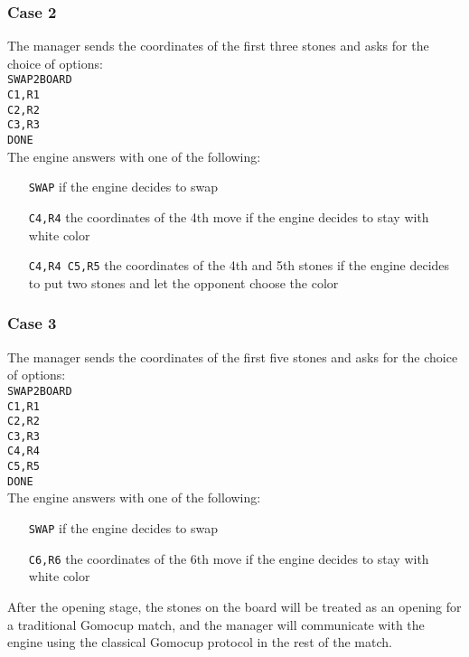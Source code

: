 \documentclass[12pt,a4paper]{article}
\begin{document}
\subsubsection{Case 2}
The manager sends the coordinates of the first three stones and asks for the choice of options:\\
\texttt{SWAP2BOARD}\\
\texttt{C1,R1}\\
\texttt{C2,R2}\\
\texttt{C3,R3}\\
\texttt{DONE}\\
The engine answers with one of the following:
\begin{enumerate}[leftmargin=7.5em]
\item[\texttt{SWAP}]{if the engine decides to swap}
\item[\texttt{C4,R4}]{the coordinates of the 4th move if the engine decides to stay with white color}
\item[\texttt{C4,R4 C5,R5}]{the coordinates of the 4th and 5th stones if the engine decides to put two stones and let the opponent choose the color}
\end{enumerate}

\subsubsection{Case 3}
The manager sends the coordinates of the first five stones and asks for the choice of options:\\
\texttt{SWAP2BOARD}\\
\texttt{C1,R1}\\
\texttt{C2,R2}\\
\texttt{C3,R3}\\
\texttt{C4,R4}\\
\texttt{C5,R5}\\
\texttt{DONE}\\
The engine answers with one of the following:
\begin{enumerate}[leftmargin=7.5em]
\item[\texttt{SWAP}]{if the engine decides to swap}
\item[\texttt{C6,R6}]{the coordinates of the 6th move if the engine decides to stay with white color}
\end{enumerate}

After the opening stage, the stones on the board will be treated as an opening for a traditional Gomocup match, and the manager will communicate with the engine using the classical Gomocup protocol in the rest of the match.
\end{document}
